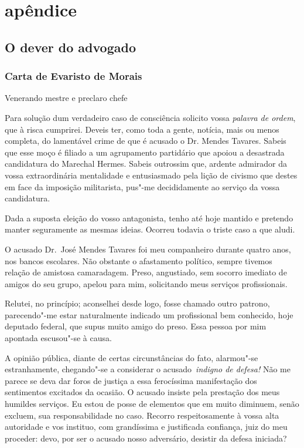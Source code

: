 \part{apêndice}

\chapter{O dever do advogado}


\section{Carta de Evaristo de Morais}
\bigskip

\noindent Venerando mestre e preclaro chefe
\bigskip

Para solução dum verdadeiro caso de
consciência solicito vossa \textit{palavra de ordem}, que à risca
cumprirei. Deveis ter, como toda a gente, notícia, mais ou menos
completa, do lamentável crime de que é acusado o Dr. Mendes Tavares.
Sabeis que esse moço é filiado a um agrupamento partidário que apoiou a
desastrada candidatura do Marechal Hermes. Sabeis outrossim que,
ardente admirador da vossa extraordinária mentalidade e entusiasmado
pela lição de civismo que destes em face da imposição militarista,
pus"-me decididamente ao serviço da vossa candidatura. 

Dada a suposta eleição do vosso antagonista, tenho até hoje mantido e pretendo manter
seguramente as mesmas ideias. Ocorreu todavia o triste caso a que aludi. 

O acusado Dr.~José Mendes Tavares foi meu companheiro durante
quatro anos, nos bancos escolares. Não obstante o afastamento
político, sempre tivemos relação de amistosa camaradagem. Preso,
angustiado, sem socorro imediato de amigos do seu grupo, apelou para
mim, solicitando meus serviços profissionais. 

Relutei, no princípio;
aconselhei desde logo, fosse chamado outro patrono, parecendo"-me
estar naturalmente indicado um profissional bem conhecido, hoje
deputado federal, que supus muito amigo do preso. Essa pessoa por mim
apontada escusou"-se à causa. 

A opinião pública, diante de certas
circunstâncias do fato, alarmou"-se estranhamente, chegando"-se a
considerar o acusado \textit{indigno de defesa!} Não me
parece se deva dar foros de justiça a essa ferocíssima manifestação dos
sentimentos excitados da ocasião. O acusado insiste pela prestação dos
meus humildes serviços. Eu estou de posse de elementos que em muito
diminuem, senão excluem, sua responsabilidade no caso. Recorro
respeitosamente à vossa alta autoridade e vos instituo, com
grandíssima e justificada confiança, juiz do meu proceder: devo, por
ser o acusado nosso adversário, desistir da defesa iniciada?

